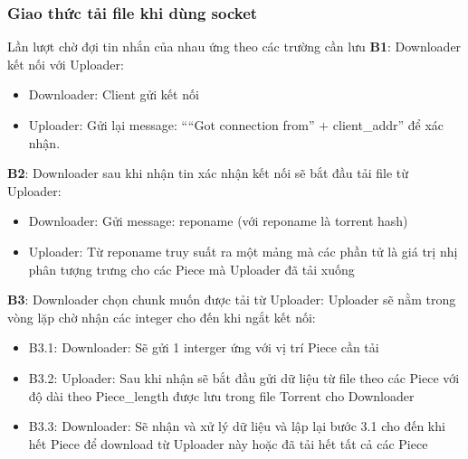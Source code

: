 \documentclass[a4paper]{article}
\begin{document}
        \subsubsection{Giao thức tải file khi dùng socket} 
        Lần lượt chờ đợi tin nhắn của nhau ứng theo các trường cần lưu
        \newline
        \newline
            \textbf{B1}: Downloader kết nối với Uploader:
                \begin{itemize}
                    \item Downloader: Client gửi kết nối
                    \item Uploader: Gửi lại message: \textquotedblleft\textquotedblleft Got connection from\textquotedblright{} $+$ client\_addr\textquotedblright{} để xác nhận.
                \end{itemize}
            \textbf{B2}: Downloader sau khi nhận tin xác nhận kết nối sẽ bắt đầu tải file từ Uploader:
                \begin{itemize}
                    \item Downloader: Gửi message: reponame (với reponame là torrent hash)
                    \item Uploader: Từ reponame truy suất ra một mảng mà các phần tử là giá trị nhị phân tượng trưng cho các Piece mà Uploader đã tải xuống
                \end{itemize}
            \textbf{B3}: Downloader chọn chunk muốn được tải từ Uploader:
                Uploader sẽ nằm trong vòng lặp chờ nhận các integer cho đến khi ngắt kết nối:
                \begin{itemize}
                    \item B3.1: Downloader: Sẽ gửi 1 interger ứng với vị trí Piece cần tải
                    \item B3.2: Uploader: Sau khi nhận sẽ bắt đầu gửi dữ liệu từ file theo các Piece với độ dài theo Piece\_length được lưu trong file Torrent cho Downloader
                    \item B3.3: Downloader: Sẽ nhận và xử lý dữ liệu và lập lại bước 3.1 cho đến khi hết Piece để download từ Uploader này hoặc đã tải hết tất cả các Piece
                \end{itemize}
\end{document}
